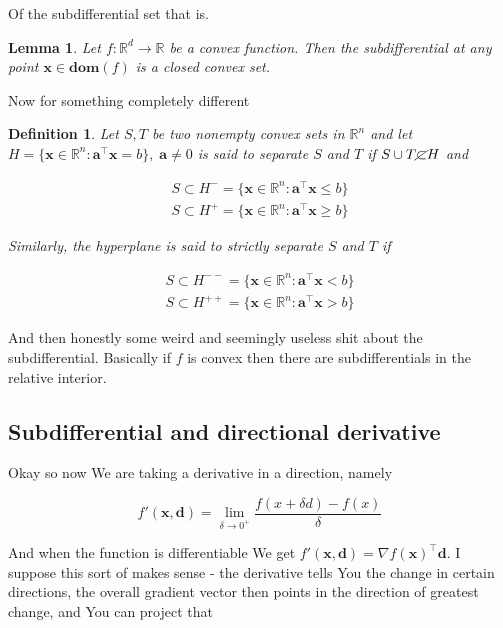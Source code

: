 \documentclass{article}
\newtheorem{definition}[theorem]{Definition}
\newtheorem{lemma}[theorem]{Lemma}
\begin{document}
		Of the subdifferential set that is.
		
		\begin{lemma}
			Let $f:\mathbb{R}^d\to\mathbb{R}$ be a convex function. Then the subdifferential at any point $\mathbf{x}\in\mathbf{dom}(f)$ is a closed convex set.
		\end{lemma}
		
		Now for something completely different
		
		\begin{definition}
			Let $S,T$ be two nonempty convex sets in $\mathbb{R}^n$ and  let $H = \{\mathbf{x} \in\mathbb{R}^n : \mathbf{a^\top x} = b  \},\;\mathbf{a}\neq 0$ is said to \textnormal{separate} $S$ and $T$ if $S\cup T \cancel{\subset} H$ and
			
			\begin{align*}
				S\subset H^- = \{ \mathbf{x}\in\mathbb{R}^n: \mathbf{a^\top\mathbf{x}}\le b \} \\
				S\subset H^+ = \{ \mathbf{x}\in\mathbb{R}^n: \mathbf{a^\top\mathbf{x}}\ge b \} 
			\end{align*}
			
			Similarly, the hyperplane is said to \textnormal{strictly separate} $S$ and $T$ if 
			
			\begin{align*}
				S\subset H^{--} = \{ \mathbf{x}\in\mathbb{R}^n: \mathbf{a^\top\mathbf{x}}< b \} \\
				S\subset H^{++} = \{ \mathbf{x}\in\mathbb{R}^n: \mathbf{a^\top\mathbf{x}}> b \} 
			\end{align*}
			
		\end{definition}
		
		And then honestly some weird and seemingly useless shit about the subdifferential. Basically if $f$ is convex then there are subdifferentials in the relative interior.
		
	\subsection{Subdifferential and directional derivative}
	
		Okay so now We are taking a derivative in a direction, namely
		
		\[ f'(\mathbf{x, d}) = \lim_{\delta\to 0^+} \frac{f(x+\delta d) - f(x)}{\delta} \]
		
		And when the function is differentiable We get $f'(\mathbf{x, d}) = \nabla f(\mathbf{x})^\top\mathbf{d}$. I suppose this sort of makes sense - the derivative tells You the change in certain directions, the overall gradient vector then points in the direction of greatest change, and You can project that 
		
\end{document}
